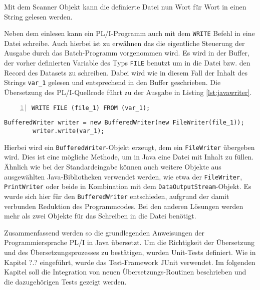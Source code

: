 Mit dem Scanner Objekt kann die definierte Datei nun Wort für Wort in einen String gelesen werden.

Neben dem einlesen kann ein PL/I-Programm auch mit dem \verb+WRITE+ Befehl in eine Datei schreibe.
Auch hierbei ist zu erwähnen das die eigentliche Steuerung der Ausgabe durch das Batch-Programm vorgenommen wird.
Es wird in der Buffer, der vorher definierten Variable des Typs \verb+FILE+ benutzt um in die Datei bzw. den Record
des Datasets zu schreiben. Dabei wird wie in diesem Fall der Inhalt des Strings \verb+var_1+ gelesen und entsprechend
in den Buffer geschrieben.
Die Übersetzung des PL/I-Quellcode führt zu der Ausgabe in Listing \ref{lst:javawriter}.

\begin{minipage}[b]{0.5\linewidth}
	\centering
	\lstset{language=PL/I,label=SliceExaple}
	\begin{lstlisting}[frame=single, numbers=left, mathescape,%
		caption={Transformation deiner If-Else-Statements}, label={lst:javawriter}]
		WRITE FILE (file_1) FROM (var_1);
	\end{lstlisting}
\end{minipage}
\hspace{0.5cm}
\begin{minipage}[b]{0.5\linewidth}
	\centering
	\lstset{language=Java,label=SliceExaple}
	\begin{lstlisting}[frame=single, mathescape,%
		title={}]
		BufferedWriter writer = new BufferedWriter(new FileWriter(file_1)); 
		writer.write(var_1);
	\end{lstlisting}
\end{minipage}  

Hierbei wird ein \verb+BufferedWriter+-Objekt erzeugt, dem ein \verb+FileWriter+ übergeben wird. Dies ist eine mögliche Methode, um in Java eine Datei mit Inhalt zu füllen. Ähnlich wie bei der Standardeingabe können auch weitere Objekte aus ausgewählten Java-Bibliotheken verwendet werden, wie etwa der \verb+FileWriter+, \verb+PrintWriter+ oder beide in Kombination mit dem \verb+DataOutputStream+-Objekt. Es wurde sich hier für den \verb+BufferedWriter+ entschieden, aufgrund der damit verbunden Reduktion des Programmcodes. Bei den anderen Lösungen werden mehr als zwei Objekte für das Schreiben in die Datei benötigt.

Zusammenfassend werden so die grundlegenden Anweisungen der Programmiersprache PL/I in Java übersetzt. Um die Richtigkeit der Übersetzung und des Übersetzungsprozesses zu bestätigen, wurden Unit-Tests definiert. Wie in Kapitel ?.? eingeführt, wurde das Test-Framework JUnit verwendet. Im folgenden Kapitel soll die Integration von neuen Übersetzungs-Routinen beschrieben und die dazugehörigen Tests gezeigt werden.

